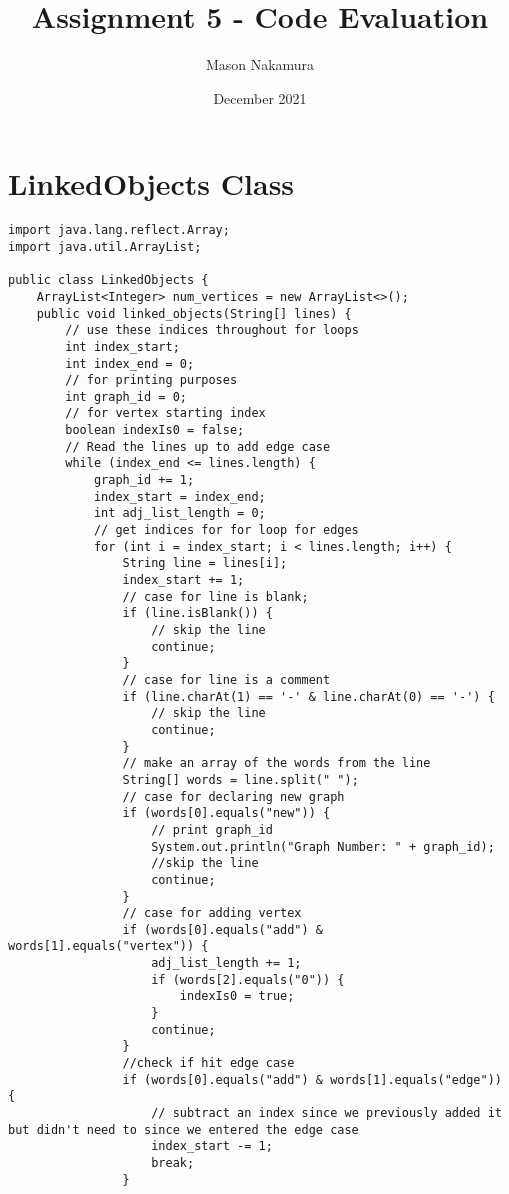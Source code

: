 \documentclass{article}
\title{Assignment 5 - Code Evaluation}
\author{Mason Nakamura}
\date{December 2021}
\begin{document}
\maketitle

\section{LinkedObjects Class}
    \begin{lstlisting}
import java.lang.reflect.Array;
import java.util.ArrayList;

public class LinkedObjects {
    ArrayList<Integer> num_vertices = new ArrayList<>();
    public void linked_objects(String[] lines) {
        // use these indices throughout for loops
        int index_start;
        int index_end = 0;
        // for printing purposes
        int graph_id = 0;
        // for vertex starting index
        boolean indexIs0 = false;
        // Read the lines up to add edge case
        while (index_end <= lines.length) {
            graph_id += 1;
            index_start = index_end;
            int adj_list_length = 0;
            // get indices for for loop for edges
            for (int i = index_start; i < lines.length; i++) {
                String line = lines[i];
                index_start += 1;
                // case for line is blank;
                if (line.isBlank()) {
                    // skip the line
                    continue;
                }
                // case for line is a comment
                if (line.charAt(1) == '-' & line.charAt(0) == '-') {
                    // skip the line
                    continue;
                }
                // make an array of the words from the line
                String[] words = line.split(" ");
                // case for declaring new graph
                if (words[0].equals("new")) {
                    // print graph_id
                    System.out.println("Graph Number: " + graph_id);
                    //skip the line
                    continue;
                }
                // case for adding vertex
                if (words[0].equals("add") & words[1].equals("vertex")) {
                    adj_list_length += 1;
                    if (words[2].equals("0")) {
                        indexIs0 = true;
                    }
                    continue;
                }
                //check if hit edge case
                if (words[0].equals("add") & words[1].equals("edge")) {
                    // subtract an index since we previously added it but didn't need to since we entered the edge case
                    index_start -= 1;
                    break;
                }


\end{lstlisting}
\end{document}
